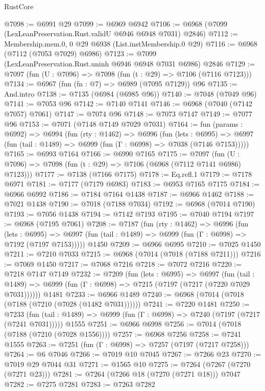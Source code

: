 \begin{lexlean}{RustCore}
\begin{coremodule}
@7098 := @6991 @29
@7099 := @6969 @6942
@7106 := @6968 (@7099 (LexLeanPreservation.Rust.validU @6946 @6948 @7031) @2846)
@7112 := Membership.mem.{0, 0} @29 @6938 (List.instMembership.{0} @29)
@7116 := @6968 (@7112 (@7053 @7029) @6986)
@7123 := @7099 (LexLeanPreservation.Rust.uninh @6946 @6948 @7031 @6986) @2846
@7129 := @7097 (fun (U : @7096) => @7098 (fun (t : @29) => @7106 (@7116 @7123)))
@7134 := @6967 (fun (fn : @7) => @6989 (@7095 @7129)) @96
@7135 := And.intro
@7138 := @7135 (@6984 (@6985 @96))
@7140 := @7048 (@7049 @96)
@7141 := @7053 @96
@7142 := @7140 @7141
@7146 := @6968 (@7040 (@7142 @7057) @7061)
@7147 := @7074 @96
@7148 := @7073 @7147
@7149 := @7077 @96
@7153 := @7071 (@7148 @7149 @7029 @7031)
@7164 := fun (params : @6992) =>
  @6994
    (fun (rty : @1462) =>
    @6996
      (fun (lets : @6995) =>
      @6997 (fun (tail : @1489) => @6999 (fun (Γ : @6998) => @7038 (@7146 @7153)))))
@7165 := @6993 @7164
@7166 := @6990 @7165
@7175 := @7097 (fun (U : @7096) => @7098 (fun (t : @29) => @7106 (@6968 (@7112 @7141 @6986) @7123)))
@7177 := @7138 (@7166 @7175)
@7178 := Eq.refl.{1}
@7179 := @7178 @6971
@7181 := @7177 (@7179 @6983)
@7183 := @6953 @7165 @7175
@7184 := @6966 @6992
@7186 := @7184 @7164 @1438
@7187 := @6966 @1462
@7188 := @7021 @1438
@7190 := @7018 (@7188 @7034)
@7192 := @6968 (@7014 @7190)
@7193 := @7056 @1438
@7194 := @7142 @7193
@7195 := @7040 @7194
@7197 := @6968 (@7195 @7061)
@7208 := @7187
    (fun (rty : @1462) =>
    @6996
      (fun (lets : @6995) =>
      @6997 (fun (tail : @1489) => @6999 (fun (Γ : @6998) => @7192 (@7197 @7153)))))
    @1450
@7209 := @6966 @6995
@7210 := @7025 @1450
@7211 := @7210 @7033
@7215 := @6968 (@7014 (@7018 (@7188 @7211)))
@7216 := @7069 @1450
@7217 := @7068 @7216
@7218 := @7072 @7216
@7220 := @7218 @7147 @7149
@7232 := @7209
    (fun (lets : @6995) =>
    @6997
      (fun (tail : @1489) => @6999 (fun (Γ : @6998) => @7215 (@7197 (@7217 (@7220 @7029 @7031))))))
    @1481
@7233 := @6966 @1489
@7240 := @6968 (@7014 (@7018 (@7188 (@7210 (@7028 (@1482 @7031))))))
@7241 := @7220 @1481
@7250 := @7233
    (fun (tail : @1489) => @6999 (fun (Γ : @6998) => @7240 (@7197 (@7217 (@7241 @7031)))))
    @1555
@7251 := @6966 @6998
@7256 := @7014 (@7018 (@7188 (@7210 (@7028 @1556))))
@7257 := @6968 @7256
@7258 := @7241 @1555
@7263 := @7251 (fun (Γ : @6998) => @7257 (@7197 (@7217 @7258)))
@7264 := @6 @7046
@7266 := @7019 @10 @7045
@7267 := @7266 @23
@7270 := @7019 @29 @7044 @31
@7271 := @1565 @10
@7275 := @7264 (@7267 (@7270 (@7271 @23)))
@7281 := @7264 (@7266 @18 (@7270 (@7271 @18))) @7047
@7282 := @7275 @7281
@7283 := @7263 @7282

\end{coremodule}
\end{lexlean}
